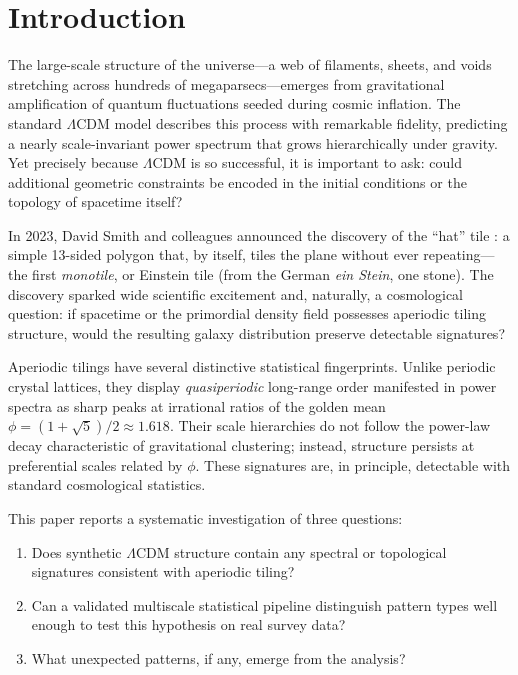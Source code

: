 \documentclass[12pt,a4paper]{article}
\begin{document}
\section{Introduction}
\label{sec:intro}

The large-scale structure of the universe---a web of filaments, sheets, and
voids stretching across hundreds of megaparsecs---emerges from gravitational
amplification of quantum fluctuations seeded during cosmic inflation.  The
standard $\Lambda$CDM model describes this process with remarkable fidelity,
predicting a nearly scale-invariant power spectrum that grows hierarchically
under gravity.  Yet precisely because $\Lambda$CDM is so successful, it is
important to ask: could additional geometric constraints be encoded in the
initial conditions or the topology of spacetime itself?

In 2023, David Smith and colleagues announced the discovery of the
``hat'' tile \citep{smith2023hat}: a simple 13-sided polygon that, by itself,
tiles the plane without ever repeating---the first \emph{monotile}, or Einstein
tile (from the German \emph{ein Stein}, one stone).  The discovery sparked wide
scientific excitement and, naturally, a cosmological question: if spacetime or
the primordial density field possesses aperiodic tiling structure, would the
resulting galaxy distribution preserve detectable signatures?

Aperiodic tilings have several distinctive statistical fingerprints.  Unlike
periodic crystal lattices, they display \emph{quasiperiodic} long-range order
manifested in power spectra as sharp peaks at irrational ratios of the golden
mean $\phi = (1+\sqrt{5})/2 \approx 1.618$.  Their scale hierarchies do not
follow the power-law decay characteristic of gravitational clustering; instead,
structure persists at preferential scales related by $\phi$.  These signatures
are, in principle, detectable with standard cosmological statistics.

This paper reports a systematic investigation of three questions:
\begin{enumerate}
  \item Does synthetic $\Lambda$CDM structure contain any spectral or topological
        signatures consistent with aperiodic tiling?
  \item Can a validated multiscale statistical pipeline distinguish pattern types
        well enough to test this hypothesis on real survey data?
  \item What unexpected patterns, if any, emerge from the analysis?
\end{enumerate}
\end{document}
